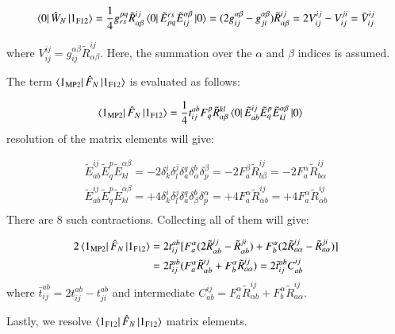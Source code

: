 \documentclass[journal=jacsat]{achemso}
\numberwithin{equation}{section}
\begin{document}
\begin{align}
\bra{0}\hat{W}_{N}\ket{1_{\text{F12}}}=\frac{1}{4}g^{pq}_{rs}\tilde{R}^{ij}_{\alpha\beta}\bra{0}\tilde{E}^{rs}_{pq}\tilde{E}^{\alpha\beta}_{ij}\ket{0}=(2g^{\alpha\beta}_{ij}-g^{\alpha\beta}_{ji})\tilde{R}^{ij}_{\alpha\beta}=2V^{ij}_{ij}-V^{ji}_{ij}=\bar{V}^{ij}_{ij}
\end{align}

where $V^{ij}_{ij}=g^{\alpha\beta}_{ij}\tilde{R}^{ij}_{\alpha\beta}$. Here, the summation over the $\alpha$ and $\beta$ indices is assumed.

The term $\bra{1_{\text{MP2}}}\hat{F}_{N}\ket{1_{\text{F12}}}$ is evaluated as follows:

\begin{align}
\bra{1_{\text{MP2}}}\hat{F}_{N}\ket{1_{\text{F12}}}&=\frac{1}{4}t^{ab}_{ij}F^{p}_{q}\tilde{R}^{kl}_{\alpha\beta}\bra{0}\tilde{E}^{ij}_{ab}\tilde{E}^{p}_{q}\tilde{E}^{\alpha\beta}_{kl}\ket{0}
\end{align}
resolution of the matrix elements will give:

\begin{align}
\tilde{E}^{ij}_{ab}\tilde{E}^{p}_{q}\tilde{E}^{\alpha\beta}_{kl}=-2\delta^{i}_{k}\delta^{j}_{l}\delta^{q}_{a}\delta^{b}_{\alpha}\delta^{\beta}_{p}=-2F^{\beta}_{a}\tilde{R}^{ij}_{b\beta}=-2F^{\alpha}_{a}\tilde{R}^{ij}_{b\alpha}\\
\tilde{E}^{ij}_{ab}\tilde{E}^{p}_{q}\tilde{E}^{\alpha\beta}_{kl}=+4\delta^{i}_{k}\delta^{j}_{l}\delta^{q}_{a}\delta^{b}_{\beta}\delta^{\alpha}_{p}=+4F^{\alpha}_{a}\tilde{R}^{ij}_{\alpha b}=+4F^{\alpha}_{a}\tilde{R}^{ij}_{\alpha b}\\
\end{align}
There are 8 such contractions. Collecting all of them will give:

\begin{align}
2\bra{1_{\text{MP2}}}\hat{F}_{N}\ket{1_{\text{F12}}}&=2t^{ab}_{ij}[F^{\alpha}_{a}(2\tilde{R}^{ij}_{\alpha b}-\tilde{R}^{ji}_{\alpha b})+F^{\alpha}_{b}(2\tilde{R}^{ij}_{a\alpha}-\tilde{R}^{ji}_{a\alpha})]\\
&=2\bar{t}^{ab}_{ij}(F^{\alpha}_{a}\tilde{R}^{ij}_{\alpha b}+F^{\alpha}_{b}\tilde{R}^{ij}_{a\alpha})=2\bar{t}^{ab}_{ij}C^{ij}_{ab}
\end{align}
where $\bar{t}^{ab}_{ij}=2t^{ab}_{ij}-t^{ab}_{ji}$ and intermediate $C^{ij}_{ab}=F^{\alpha}_{a}\tilde{R}^{ij}_{\alpha b}+F^{\alpha}_{b}\tilde{R}^{ij}_{a\alpha}$.

Lastly, we resolve $\bra{1_{\text{F12}}}\hat{F}_{N}\ket{1_{\text{F12}}}$ matrix elements. 
\end{document}
